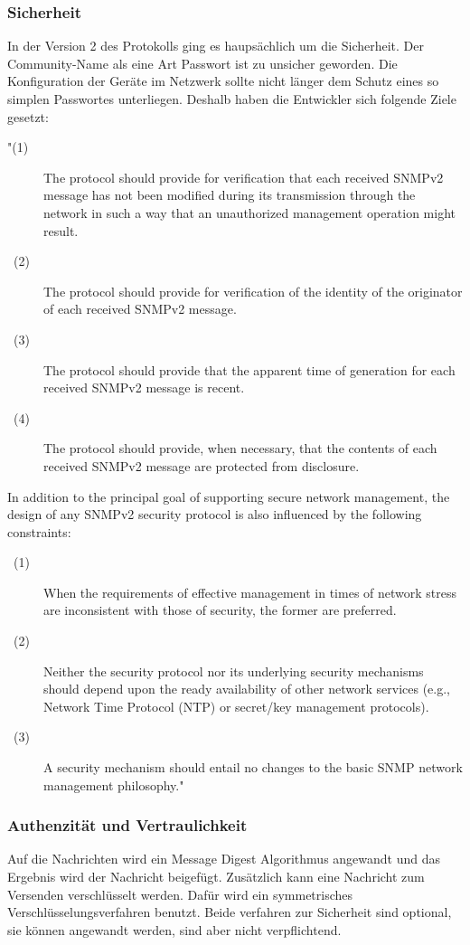 \documentclass[11pt,a4paper]{article}
\begin{document}
\subsubsection{Sicherheit}
In der Version 2 des Protokolls ging es haupsächlich um die Sicherheit. Der Community-Name als eine Art Passwort ist zu unsicher geworden. Die Konfiguration der Geräte im Netzwerk sollte nicht länger dem Schutz eines so simplen Passwortes unterliegen. Deshalb haben die Entwickler sich folgende Ziele gesetzt:
\begin{description}
	\item["(1)]
	The protocol should provide for verification that each received SNMPv2 message has not been modified during its transmission through the network 	in such a way that an unauthorized management operation might result.       
	\item[\ (2)]
	The protocol should provide for verification of the identity of the originator of each received SNMPv2 message.
	\item[\ (3)]
	The protocol should provide that the apparent time of generation for each received SNMPv2 message is recent.
	\item[\ (4)]
	The protocol should provide, when necessary, that the contents of each received SNMPv2 message are protected from disclosure.
\end{description}
In addition to the principal goal of supporting secure network management, the design of any SNMPv2 security protocol is also influenced by the following constraints:
\begin{description}
	\item[\ (1)]
	When the requirements of effective management in times of network stress are inconsistent with those of security, the former are preferred.
	\item[\ (2)]
	Neither the security protocol nor its underlying security mechanisms should depend upon the ready availability of other network services (e.g., 				Network Time Protocol (NTP) or secret/key management protocols).
	\item[\ (3)]
	A security mechanism should entail no changes to the basic SNMP network management philosophy."\ 
	\cite{rfcSnmpV2Securety}\\
\end{description}

\subsubsection{Authenzität und Vertraulichkeit}
Auf die Nachrichten wird ein Message Digest Algorithmus angewandt und das Ergebnis wird der Nachricht beigefügt. Zusätzlich kann eine Nachricht zum Versenden verschlüsselt werden. Dafür wird ein symmetrisches Verschlüsselungsverfahren benutzt. Beide verfahren zur Sicherheit sind optional, sie können angewandt werden, sind aber nicht verpflichtend.\\
\end{document}
